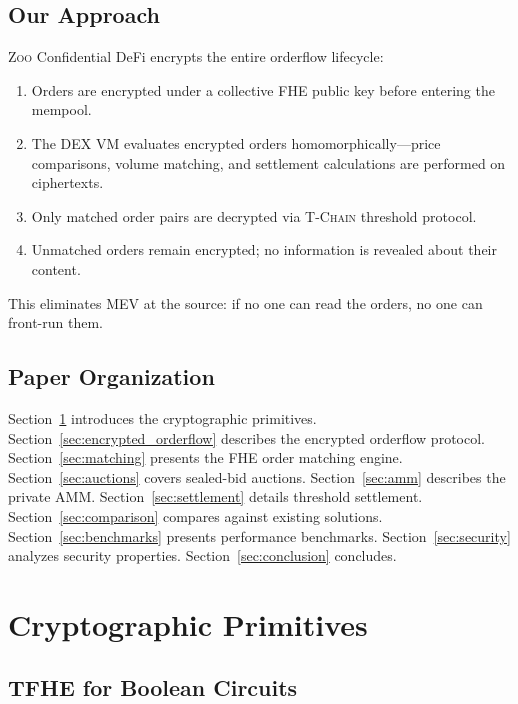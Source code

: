 \documentclass[11pt,letterpaper]{article}
\theoremstyle{definition}
\theoremstyle{remark}
\newcommand{\Zoo}{\textsc{Zoo}}
\newcommand{\TChain}{\textsc{T-Chain}}
\newcommand{\FHE}{\textsc{FHE}}
\newcommand{\MEV}{\textsc{MEV}}
\newcommand{\DEX}{\textsc{DEX}}
\begin{document}
\subsection{Our Approach}

\Zoo{} Confidential DeFi encrypts the entire orderflow lifecycle:

\begin{enumerate}
    \item Orders are encrypted under a collective \FHE{} public key before entering the mempool.
    \item The \DEX{} VM evaluates encrypted orders homomorphically---price comparisons, volume matching, and settlement calculations are performed on ciphertexts.
    \item Only matched order pairs are decrypted via \TChain{} threshold protocol.
    \item Unmatched orders remain encrypted; no information is revealed about their content.
\end{enumerate}

This eliminates \MEV{} at the source: if no one can read the orders, no one can front-run them.

\subsection{Paper Organization}

Section~\ref{sec:primitives} introduces the cryptographic primitives. Section~\ref{sec:encrypted_orderflow} describes the encrypted orderflow protocol. Section~\ref{sec:matching} presents the FHE order matching engine. Section~\ref{sec:auctions} covers sealed-bid auctions. Section~\ref{sec:amm} describes the private AMM. Section~\ref{sec:settlement} details threshold settlement. Section~\ref{sec:comparison} compares against existing solutions. Section~\ref{sec:benchmarks} presents performance benchmarks. Section~\ref{sec:security} analyzes security properties. Section~\ref{sec:conclusion} concludes.

\section{Cryptographic Primitives}
\label{sec:primitives}

\subsection{TFHE for Boolean Circuits}
\end{document}
